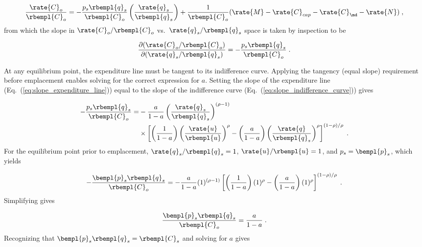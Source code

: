 \begin{equation}
  \frac{\rate{C}_o}{\rbempl{C}_o} = - \frac{p_s \rbempl{q}_s}{\rbempl{C}_o}  
                                        \left( \frac{\rate{q}_s}{\rbempl{q}_s}   \right)
                                    + \frac{1}{\rbempl{C}_o}
                                          (\rate{M} - \rate{C}_{cap} - \rate{C}_{\md} - \rate{N}) \; ,
\end{equation}
%
from which the slope in $\rate{C}_o/\rbempl{C}_o$ vs.\ $\rate{q}_s/\rbempl{q}_s$ space
is taken by inspection to be

\begin{equation} \label{eq:slope_expenditure_line}
  \frac{\partial (\rate{C}_o/\rbempl{C}_o)}{\partial (\rate{q}_s/\rbempl{q}_s)} =
              - \frac{p_s \rbempl{q}_s}{\rbempl{C}_o} \; .
\end{equation}

At any equilibrium point, the expenditure line must be tangent to its indifference curve.
Applying the tangency (equal slope) requirement before emplacement enables 
solving for the correct expression for $a$.
Setting the slope of the expenditure line (Eq.~(\ref{eq:slope_expenditure_line}))
equal to the slope of the indifference curve (Eq.~(\ref{eq:slope_indifference_curve})) gives

\begin{align}
  - \frac{p_s \rbempl{q}_s}{\rbempl{C}_o} =& 
        -\frac{a}{1 - a} \left( \frac{\rate{q}_s}{\rbempl{q}_s} \right)^{(\rho -1)} \nonumber \\
        &\times \left[ \left( \frac{1}{1 - a} \right) \left( \frac{\rate{u}}{\rbempl{u}} \right)^\rho
                - \left( \frac{a}{1 - a} \right) 
                          \left( \frac{\rate{q}}{\rbempl{q}_s} \right)^\rho \right]^{(1 - \rho)/\rho} \; .
\end{align}
%
For the equilibrium point 
prior to emplacement, $\rate{q}_s/\rbempl{q}_s = 1$, $\rate{u}/\rbempl{u} = 1$, and
$p_s = \bempl{p}_s$, which yields

\begin{equation}
  - \frac{\bempl{p}_s \rbempl{q}_s}{\rbempl{C}_o} =
        -\frac{a}{1 - a} (1)^{(\rho -1)}
        \left[ \left( \frac{1}{1 - a} \right) (1)^\rho
                - \left( \frac{a}{1 - a} \right) 
                          (1)^\rho \right]^{(1 - \rho)/\rho} \; .
\end{equation}
%
Simplifying gives

\begin{equation}
  \frac{\bempl{p}_s \rbempl{q}_s}{\rbempl{C}_o} = \frac{a}{1 - a} \; .
\end{equation}
%
Recognizing that $\bempl{p}_s \rbempl{q}_s = \rbempl{C}_s$ and solving for
$a$ gives

